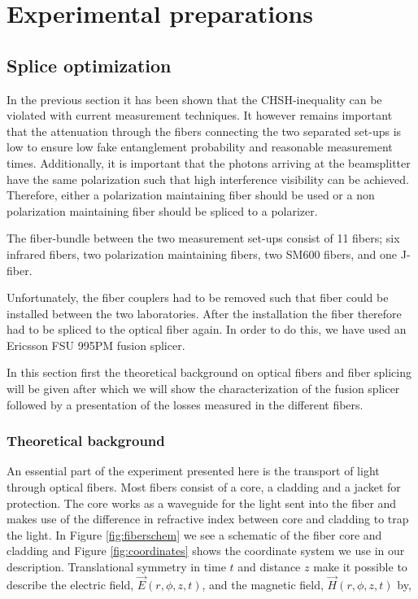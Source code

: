\color{tudelft-cyan}
\chapter{Experimental preparations}
\color{black}


\label{intro}





\color{tudelft-cyan}
\section{Splice optimization}
\color{black}

In the previous section it has been shown that the CHSH-inequality can be violated with current measurement techniques. It however remains important that the attenuation through the fibers connecting the two separated set-ups is low to ensure low fake entanglement probability and reasonable measurement times. Additionally, it is important that the photons arriving at the beamsplitter have the same polarization such that high interference visibility can be achieved. Therefore, either a polarization maintaining fiber should be used or a non polarization maintaining fiber should be spliced to a polarizer. 

The fiber-bundle between the two measurement set-ups consist of 11 fibers; six infrared fibers, two polarization maintaining fibers, two SM600 fibers, and one J-fiber. 

Unfortunately, the fiber couplers had to be removed such that fiber could be installed between the two laboratories. After the installation the fiber therefore had to be spliced to the optical fiber again. In order to do this, we have used an Ericsson FSU 995PM fusion splicer. 

In this section first the theoretical background on optical fibers and fiber splicing will be given after which we will show the characterization of the fusion splicer followed by a presentation of the losses measured in the different fibers. 

\color{tudelft-cyan}
\subsection{Theoretical background}
\color{black}
An essential part of the experiment presented here is the transport of light through optical fibers. Most fibers consist of a core, a cladding and a jacket for protection. The core works as a waveguide for the light sent into the fiber and makes use of the difference in refractive index between core and cladding to trap the light.  In Figure \ref{fig:fiberschem} we see a schematic of the fiber core and cladding and Figure \ref{fig:coordinates} shows the coordinate system we use in our description. Translational symmetry in time $t$ and distance $z$ make it possible to describe the electric field, $\vec{E}(r,\phi,z,t)$, and the magnetic field, $\vec{H}(r,\phi,z,t)$ by, 

